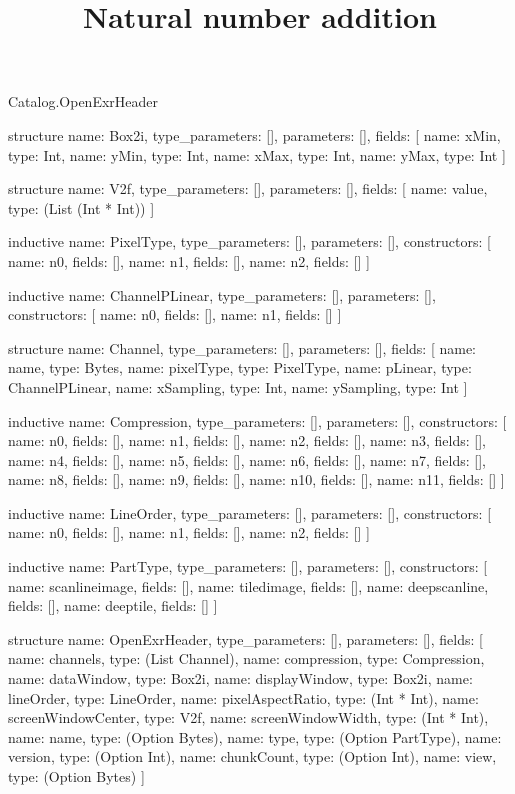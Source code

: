 \begin{lexlean}{Catalog.OpenExrHeader}
\title{Natural number addition}
\begin{semanticmodule}
structure{
  name: Box2i,
  type_parameters: [],
  parameters: [],
  fields: [
    {name: xMin, type: Int},
    {name: yMin, type: Int},
    {name: xMax, type: Int},
    {name: yMax, type: Int}
  ]
}

structure{
  name: V2f,
  type_parameters: [],
  parameters: [],
  fields: [
    {name: value, type: (List (Int * Int))}
  ]
}

inductive{
  name: PixelType,
  type_parameters: [],
  parameters: [],
  constructors: [
    {name: n0, fields: []},
    {name: n1, fields: []},
    {name: n2, fields: []}
  ]
}

inductive{
  name: ChannelPLinear,
  type_parameters: [],
  parameters: [],
  constructors: [
    {name: n0, fields: []},
    {name: n1, fields: []}
  ]
}

structure{
  name: Channel,
  type_parameters: [],
  parameters: [],
  fields: [
    {name: name, type: Bytes},
    {name: pixelType, type: PixelType},
    {name: pLinear, type: ChannelPLinear},
    {name: xSampling, type: Int},
    {name: ySampling, type: Int}
  ]
}

inductive{
  name: Compression,
  type_parameters: [],
  parameters: [],
  constructors: [
    {name: n0, fields: []},
    {name: n1, fields: []},
    {name: n2, fields: []},
    {name: n3, fields: []},
    {name: n4, fields: []},
    {name: n5, fields: []},
    {name: n6, fields: []},
    {name: n7, fields: []},
    {name: n8, fields: []},
    {name: n9, fields: []},
    {name: n10, fields: []},
    {name: n11, fields: []}
  ]
}

inductive{
  name: LineOrder,
  type_parameters: [],
  parameters: [],
  constructors: [
    {name: n0, fields: []},
    {name: n1, fields: []},
    {name: n2, fields: []}
  ]
}

inductive{
  name: PartType,
  type_parameters: [],
  parameters: [],
  constructors: [
    {name: scanlineimage, fields: []},
    {name: tiledimage, fields: []},
    {name: deepscanline, fields: []},
    {name: deeptile, fields: []}
  ]
}

structure{
  name: OpenExrHeader,
  type_parameters: [],
  parameters: [],
  fields: [
    {name: channels, type: (List Channel)},
    {name: compression, type: Compression},
    {name: dataWindow, type: Box2i},
    {name: displayWindow, type: Box2i},
    {name: lineOrder, type: LineOrder},
    {name: pixelAspectRatio, type: (Int * Int)},
    {name: screenWindowCenter, type: V2f},
    {name: screenWindowWidth, type: (Int * Int)},
    {name: name, type: (Option Bytes)},
    {name: type, type: (Option PartType)},
    {name: version, type: (Option Int)},
    {name: chunkCount, type: (Option Int)},
    {name: view, type: (Option Bytes)}
  ]
}
\end{semanticmodule}
\end{lexlean}
